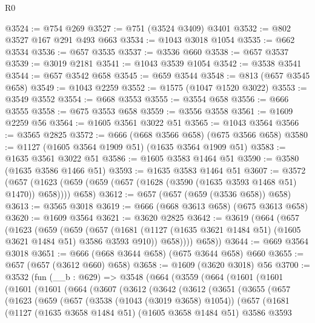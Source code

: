 \begin{lexlean}{R0}
\begin{coremodule}
@3524 := @754 @269
@3527 := @751 (@3524 @3409) @3401
@3532 := @802 @3527 @167 @291 @493 @663
@3534 := @1043 @3018 @1054
@3535 := @662 @3534
@3536 := @657 @3535
@3537 := @3536 @660
@3538 := @657 @3537
@3539 := @3019 @2181
@3541 := @1043 @3539 @1054
@3542 := @3538 @3541
@3544 := @657 @3542 @658
@3545 := @659 @3544
@3548 := @813 (@657 @3545 @658)
@3549 := @1043 @2259
@3552 := @1575 (@1047 @1520 @3022)
@3553 := @3549 @3552
@3554 := @668 @3553
@3555 := @3554 @658
@3556 := @666 @3555
@3558 := @675 @3553 @658
@3559 := @3556 @3558
@3561 := @1609 @2259 @56
@3564 := @1605 @3561 @3022 @51
@3565 := @1043 @3564
@3566 := @3565 @2825
@3572 := @666 (@668 @3566 @658) (@675 @3566 @658)
@3580 := @1127 (@1605 @3564 @1909 @51) (@1635 @3564 @1909 @51)
@3583 := @1635 @3561 @3022 @51
@3586 := @1605 @3583 @1464 @51
@3590 := @3580 (@1635 @3586 @1466 @51)
@3593 := @1635 @3583 @1464 @51
@3607 := @3572
    (@657 (@1623 (@659 (@659 (@657 (@1628 (@3590 (@1635 @3593 @1468 @51) @1470)) @658)))) @658)
@3612 := @657 (@657 (@659 (@3536 @658)) @658)
@3613 := @3565 @3018
@3619 := @666 (@668 @3613 @658) (@675 @3613 @658)
@3620 := @1609 @3564
@3621 := @3620 @2825
@3642 := @3619
    (@664
      (@657
        (@1623
          (@659
            (@659
              (@657
                (@1681 (@1127 (@1635 @3621 @1484 @51) (@1605 @3621 @1484 @51) @3586 @3593 @910))
                @658))))
        @658))
@3644 := @669 @3564 @3018
@3651 := @666 (@668 @3644 @658) (@675 @3644 @658) @660
@3655 := @657 (@657 (@3612 @660) @658)
@3658 := @1609 (@3620 @3018) @56
@3700 := @3532
    (fun (__b : @629) =>
    @3548
      (@664
        (@3559
          (@664
            (@1601
              (@1601
                (@1601
                  (@1601
                    (@664
                      (@3607
                        (@3612
                          (@3642
                            (@3612
                              (@3651
                                (@3655
                                  (@657
                                    (@1623
                                      (@659
                                        (@657
                                          (@3538 (@1043 (@3019 @3658) @1054))
                                          (@657
                                            (@1681
                                              (@1127
                                                (@1635 @3658 @1484 @51)
                                                (@1605 @3658 @1484 @51)
                                                @3586
                                                @3593

\end{coremodule}
\end{lexlean}
